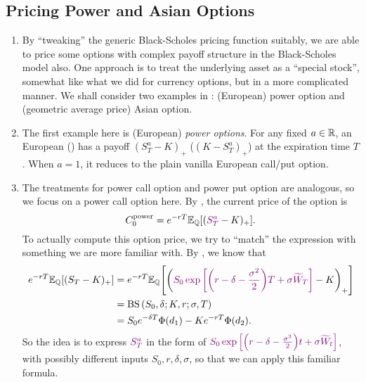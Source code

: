 \subsection{Pricing Power and Asian Options}
\label{subsect:power-asian}
\begin{enumerate}
\item By ``tweaking'' the generic Black-Scholes pricing function suitably, we
are able to price some options with complex payoff structure in the
Black-Scholes model also. One approach is to treat the underlying asset as a
``special stock'', somewhat like what we did for currency options, but in a
more complicated manner. We shall consider two examples in
: (European) power option and (geometric average
price) Asian option.

\item The first example here is (European) \emph{power options}. For any fixed
\(a\in\mathbb{R}\), an European  () has
a payoff \((S_T^{a}-K)_{+}\) (\((K-S_T^{a})_{+}\)) at the expiration time
\(T\). When \(a=1\), it reduces to the plain vanilla European call/put option.

\item The treatments for power call option and power put option are analogous,
so we focus on a power call option here. By ,
the current price of the option is
\[
C_0^{\mathrm{power}}=e^{-rT}\mathbb{E}_{\mathbb{Q}}\qty[({\color{violet}S_T^{a}}-K)_{+}].
\]
To actually compute this option price, we try to ``match'' the expression with
something we are more familiar with. By , we know
that
\begin{align*}
e^{-rT}\mathbb{E}_{\mathbb{Q}}\qty[(S_T-K)_{+}]
&=e^{-rT}\mathbb{E}_{\mathbb{Q}}\qty[\qty({\color{violet}S_0\exp\qty[\qty(r-\delta-\frac{\sigma^2}{2})T+\sigma\widetilde{W}_T]}-K)_{+}] \\
&=\operatorname{BS}\qty(S_0,\delta;K,r;\sigma,T) \\
&=S_0e^{-\delta T}\Phi(d_1)-Ke^{-rT}\Phi(d_2).
\end{align*}
So the idea is to express \({\color{violet}S_T^a}\) in the form of
\({\color{violet}S_0\exp\qty[\qty(r-\delta-\frac{\sigma^2}{2})t+\sigma\widetilde{W}_t]}\),
with possibly different inputs \(S_0,r,\delta,\sigma\), so that we can apply
this familiar formula.


\end{enumerate}
